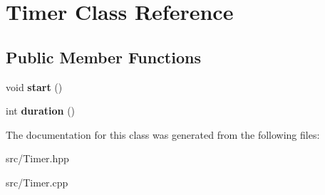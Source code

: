 \hypertarget{class_timer}{}\section{Timer Class Reference}
\label{class_timer}
\subsection*{Public Member Functions}
\begin{DoxyCompactItemize}
\item 
\mbox{\label{class_timer_a3a8b5272198d029779dc9302a54305a8}} 
void {\bfseries start} ()
\item 
\mbox{\label{class_timer_a8fc4d7e945ec22dda323afe014fc96b7}} 
int {\bfseries duration} ()
\end{DoxyCompactItemize}


The documentation for this class was generated from the following files\+:\begin{DoxyCompactItemize}
\item 
src/Timer.\+hpp\item 
src/Timer.\+cpp\end{DoxyCompactItemize}
